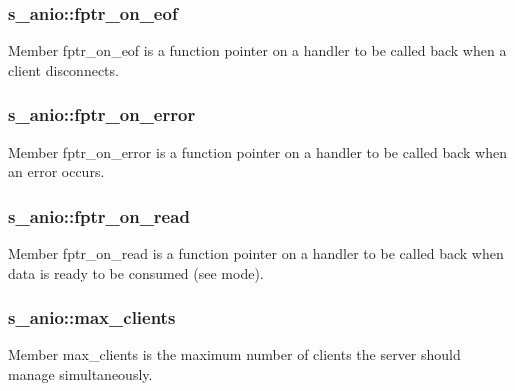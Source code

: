 \subsubsection[{fptr\+\_\+on\+\_\+eof}]{\setlength{\rightskip}{0pt plus 5cm}s\+\_\+anio\+::fptr\+\_\+on\+\_\+eof}\label{structs__anio_af681ce20da5e7d7df16e5c7c3af6110e}
Member \textquotesingle{}fptr\+\_\+on\+\_\+eof\textquotesingle{} is a function pointer on a handler to be called back when a client disconnects. \hypertarget{structs__anio_a1ca9612c8081f66ed33e0824627f7262}{}
\subsubsection[{fptr\+\_\+on\+\_\+error}]{\setlength{\rightskip}{0pt plus 5cm}s\+\_\+anio\+::fptr\+\_\+on\+\_\+error}\label{structs__anio_a1ca9612c8081f66ed33e0824627f7262}
Member \textquotesingle{}fptr\+\_\+on\+\_\+error\textquotesingle{} is a function pointer on a handler to be called back when an error occurs. \hypertarget{structs__anio_aca8e00d72ff1a420757122fe8328f9e5}{}
\subsubsection[{fptr\+\_\+on\+\_\+read}]{\setlength{\rightskip}{0pt plus 5cm}s\+\_\+anio\+::fptr\+\_\+on\+\_\+read}\label{structs__anio_aca8e00d72ff1a420757122fe8328f9e5}
Member \textquotesingle{}fptr\+\_\+on\+\_\+read\textquotesingle{} is a function pointer on a handler to be called back when data is ready to be consumed (see mode). \hypertarget{structs__anio_a63a323821e4c59f823cd9f7ccfc49f67}{}
\subsubsection[{max\+\_\+clients}]{\setlength{\rightskip}{0pt plus 5cm}s\+\_\+anio\+::max\+\_\+clients}\label{structs__anio_a63a323821e4c59f823cd9f7ccfc49f67}
Member \textquotesingle{}max\+\_\+clients\textquotesingle{} is the maximum number of clients the server should manage simultaneously. \hypertarget{structs__anio_a8103ffbbc1a816b3461f8b0c26c9c3ff}{}
